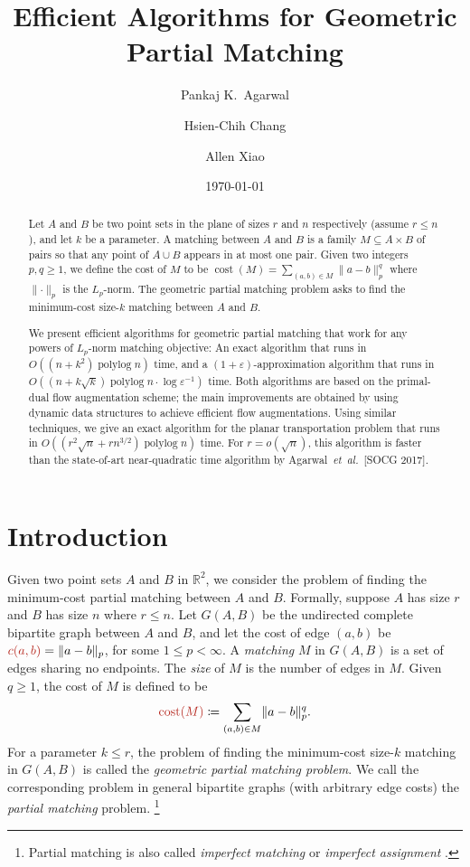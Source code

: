 \documentclass[a4paper,UKenglish]{socg-lipics-v2018}
\title{Efficient Algorithms for Geometric Partial Matching}
\author{Pankaj K.\ Agarwal}{Duke University, USA}{pankaj@cs.duke.edu}{}{}
\author{Hsien-Chih Chang}{Duke University, USA}{hsienchih.chang@duke.edu}{}{}
\author{Allen Xiao}{Duke University, USA}{axiao@cs.duke.edu}{}{}
\date{\today}
\def\etal{\emph{et~al.}}
\def\etal{\textit{et~al.}}
\def\polylog{\mathop{\mathrm{polylog}}}
\def\eps{\varepsilon}
\def\reals{\mathbb{R}}
\def\norm#1{\mathopen\| #1 \mathclose\|}	%
\def\cost{\operatorname{cost}}
\theoremstyle{plain}
\numberwithin{figure}{section}
\def\EMPH#1{\textcolor{BrickRed}{{\emph{#1}}}}
\begin{document}
\maketitle

\begin{abstract}
Let $A$ and $B$ be two point sets in the plane of sizes $r$ and $n$ respectively (assume $r \leq n$), and let $k$ be a parameter.
A matching between $A$ and $B$ is a family $M \subseteq A \times B$ of pairs so that any point of $A \cup B$ appears in at most one pair.
Given two integers $p, q \geq 1$, we define the cost of $M$ to be $\cost(M) = \sum_{(a, b) \in M}\norm{a-b}_p^q$ where $\norm{\cdot}_p$ is the $L_p$-norm.
The geometric partial matching problem asks to find the minimum-cost size-$k$ matching between $A$ and $B$.

We present efficient algorithms for geometric partial matching that work for any powers of $L_p$-norm matching objective:
An exact algorithm that runs in $O((n + k^2)\polylog n)$ time, and a $(1 + \eps)$-approximation algorithm that runs in $O((n + k\sqrt{k})\polylog n \cdot \log\eps^{-1})$ time.
Both algorithms are based on the primal-dual flow augmentation scheme; the main improvements are obtained by using dynamic data structures to achieve efficient flow augmentations.
Using similar techniques, we give an exact algorithm for the planar transportation problem that runs in $O((r^2\sqrt{n} + rn^{3/2})\polylog n)$ time.
For $r = o(\sqrt{n})$, this algorithm is faster than the state-of-art near-quadratic time algorithm by Agarwal~\etal\ [SOCG 2017].
\end{abstract}


\section{Introduction}

Given two point sets $A$ and $B$ in $\reals^2$, we consider the problem of finding
the minimum-cost partial matching between $A$ and $B$.
Formally, suppose $A$ has size $r$ and $B$ has size $n$ where $r \leq n$.
Let $G(A, B)$ be the undirected complete bipartite graph between
$A$ and $B$, and let the cost of edge $(a, b)$ be
$\EMPH{$c(a, b)$} = \norm{a-b}_p$, for some $1 \leq p < \infty$.
A \EMPH{matching} $M$ in $G(A, B)$ is a set of edges sharing no endpoints.
The \EMPH{size} of $M$ is the number of edges in $M$.
Given $q \geq 1$, the cost of $M$ is defined to be
\begin{equation*}
	\EMPH{$\cost(M)$} \coloneqq \sum_{(a, b) \in M} \norm{a-b}_p^q.
\end{equation*}
For a parameter $k \leq r$, the problem of finding the minimum-cost
size-$k$ matching in $G(A, B)$ is called the \EMPH{geometric partial matching problem}.
We call the corresponding problem in general bipartite graphs (with arbitrary
edge costs) the \EMPH{partial matching} problem.%
\footnote{Partial matching is also called \EMPH{imperfect matching} or \EMPH{imperfect assignment} \cite{RT12,GHKT17}.}
\end{document}
